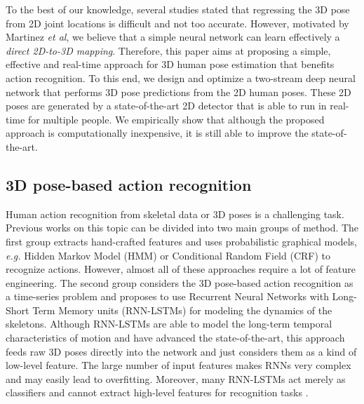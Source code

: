 \documentclass{bmvc2k}
\def\etal{\emph{et al}\bmvaOneDot}
\begin{document}
To the best of our knowledge, several studies \cite{pavlakos2017coarse,VNect_SIGGRAPH2017,Katircioglu2018} stated that regressing the 3D pose from 2D joint locations is difficult and not too accurate. However, motivated by Martinez \etal \cite{martinez_2017_3dbaseline}, we believe that a simple neural network can learn effectively a \textit{direct 2D-to-3D mapping}. Therefore, this paper aims at proposing a simple, effective and real-time approach for 3D human pose estimation that benefits action recognition. To this end, we design and optimize a two-stream deep neural network that performs 3D pose predictions from the 2D human poses. These 2D poses are generated by a state-of-the-art 2D detector that is able to run in real-time for multiple people. We empirically show that although the proposed approach is computationally inexpensive, it is still able to improve the state-of-the-art.\\[-0.8cm]
\subsection{3D pose-based action recognition \\[-0.1cm]}
Human action recognition from skeletal data or 3D poses is a challenging task. Previous works on this topic can be divided into two main groups of method. The first group \cite{Lv2006RecognitionAS,Wang2012MiningAE,Vemulapalli2014HumanAR} extracts hand-crafted features and uses probabilistic graphical models, \textit{e.g.} Hidden Markov Model (HMM) \cite{Lv2006RecognitionAS} or Conditional Random Field (CRF) \cite{Han2010DiscriminativeHA} to recognize actions. However, almost all of these approaches require a lot of feature engineering. The second group \cite{Liu2016SpatioTemporalLW,Du2015HierarchicalRN,Shahroudy2016NTURA} considers the 3D pose-based action recognition as a time-series problem and proposes to use Recurrent Neural Networks with Long-Short Term Memory units (RNN-LSTMs) \cite{Hochreiter1997LongSM} for modeling the dynamics of the skeletons. Although RNN-LSTMs are able to model the long-term temporal characteristics of motion and have advanced the state-of-the-art, this approach feeds raw 3D poses directly into the network and just considers them as a kind of low-level feature. The large number of input features makes RNNs very complex and may easily lead to overfitting. Moreover, many RNN-LSTMs act merely as classifiers and cannot extract high-level features for recognition tasks \cite{Sainath2015ConvolutionalLS}.
\end{document}
